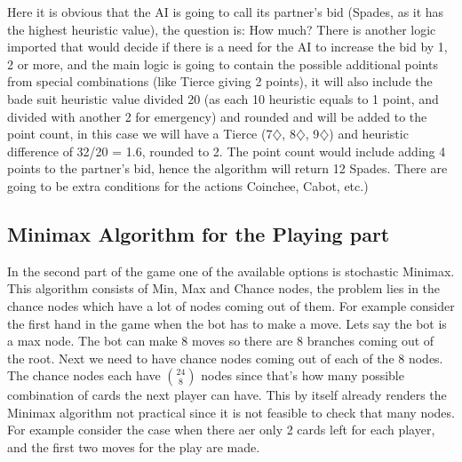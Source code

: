 Here it is obvious that the AI
is going to call its partner’s bid (Spades, as it has the highest heuristic value), the question is: How much? There is another logic
imported that would decide if there is a need for the AI to increase the bid by 1, 2 or
more, and the main logic is going to contain the possible additional points from special
combinations (like Tierce giving 2 points), it will also include the bade suit heuristic
value divided 20 (as each 10 heuristic equals to 1 point, and divided with another 2 for emergency)
and rounded and will be added to the point
count, in this case we will have a Tierce (7$\diamondsuit$, 8$\diamondsuit$, 9$\diamondsuit$) and heuristic difference of 32/20
= 1.6, rounded to 2. The point count would include adding 4 points to the partner’s bid,
hence the algorithm will return 12 Spades. There are going to be extra conditions for
the actions Coinchee, Cabot, etc.)


\subsection{Minimax Algorithm for the Playing part}
\hspace{\parindent} In the second part of the game one of the available options is stochastic Minimax.
This algorithm consists of Min, Max and Chance nodes, the problem lies in the chance nodes which have a lot of nodes coming out of them.
For example consider the first hand in the game when the bot has to make a move. Lets say the bot is a max node.
The bot can make 8 moves so there are 8 branches coming out of the root. Next we need to have chance nodes coming out of each of the 8 nodes.
The chance nodes each have $\binom{24}{8}$ nodes since that's how many possible combination of cards the next player can have.
This by itself already renders the Minimax algorithm not practical since it is not feasible to check that many nodes.
For example consider the case when there aer only 2 cards left for each player, and the first two moves for the play are made.

